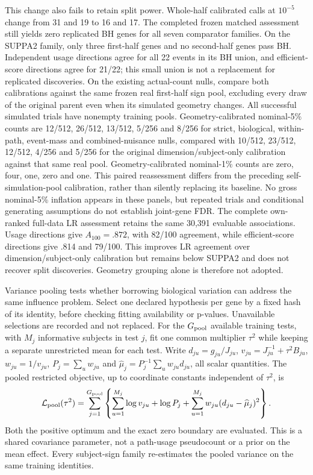 \documentclass[11pt]{article}
\begin{document}
This change also fails to retain split power. Whole-half calibrated calls at \(10^{-5}\) change from 31 and 19 to 16 and 17. The completed frozen matched assessment still yields zero replicated BH genes for all seven comparator families. On the SUPPA2 family, only three first-half genes and no second-half genes pass BH. Independent usage directions agree for all 22 events in its BH union, and efficient-score directions agree for 21/22; this small union is not a replacement for replicated discoveries. On the existing actual-count nulls, compare both calibrations against the same frozen real first-half sign pool, excluding every draw of the original parent even when its simulated geometry changes. All successful simulated trials have nonempty training pools. Geometry-calibrated nominal-5\% counts are 12/512, 26/512, 13/512, 5/256 and 8/256 for strict, biological, within-path, event-mass and combined-nuisance nulls, compared with 10/512, 23/512, 12/512, 4/256 and 5/256 for the original dimension/subject-only calibration against that same real pool. Geometry-calibrated nominal-1\% counts are zero, four, one, zero and one. This paired reassessment differs from the preceding self-simulation-pool calibration, rather than silently replacing its baseline. No gross nominal-5\% inflation appears in these panels, but repeated trials and conditional generating assumptions do not establish joint-gene FDR. The complete own-ranked full-data LR assessment retains the same 30,391 evaluable associations. Usage directions give \(A_{100}=.872\), with 82/100 agreement, while efficient-score directions give .814 and 79/100. This improves LR agreement over dimension/subject-only calibration but remains below SUPPA2 and does not recover split discoveries. Geometry grouping alone is therefore not adopted.

Variance pooling tests whether borrowing biological variation can address the same influence problem. Select one declared hypothesis per gene by a fixed hash of its identity, before checking fitting availability or p-values. Unavailable selections are recorded and not replaced. For the \(G_{\rm pool}\) available training tests, with \(M_j\) informative subjects in test \(j\), fit one common multiplier \(\tau^2\) while keeping a separate unrestricted mean for each test. Write \(d_{ju}=g_{ju}/J_{ju}\), \(v_{ju}=J_{ju}^{-1}+\tau^2B_{ju}\), \(w_{ju}=1/v_{ju}\), \(P_j=\sum_uw_{ju}\) and \(\widehat\mu_j=P_j^{-1}\sum_uw_{ju}d_{ju}\), all scalar quantities. The pooled restricted objective, up to coordinate constants independent of \(\tau^2\), is \begin{equation}\mathcal L_{\rm pool}(\tau^2)=\sum_{j=1}^{G_{\rm pool}}\left\{\sum_{u=1}^{M_j}\log v_{ju}+\log P_j+\sum_{u=1}^{M_j}w_{ju}(d_{ju}-\widehat\mu_j)^2\right\}.\end{equation} Both the positive optimum and the exact zero boundary are evaluated. This is a shared covariance parameter, not a path-usage pseudocount or a prior on the mean effect. Every subject-sign family re-estimates the pooled variance on the same training identities.
\end{document}
